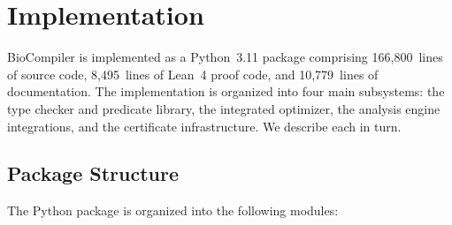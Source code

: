 
\FloatBarrier
\section{Implementation}\label{sec:impl}

BioCompiler is implemented as a Python~3.11 package comprising
166,800~lines of source code, 8,495~lines of Lean~4 proof code, and
10,779~lines of documentation.  The implementation is organized into four
main subsystems: the type checker and predicate library, the integrated
optimizer, the analysis engine integrations, and the certificate
infrastructure.  We describe each in turn.

\subsection{Package Structure}\label{sec:package}

The Python package is organized into the following modules:

